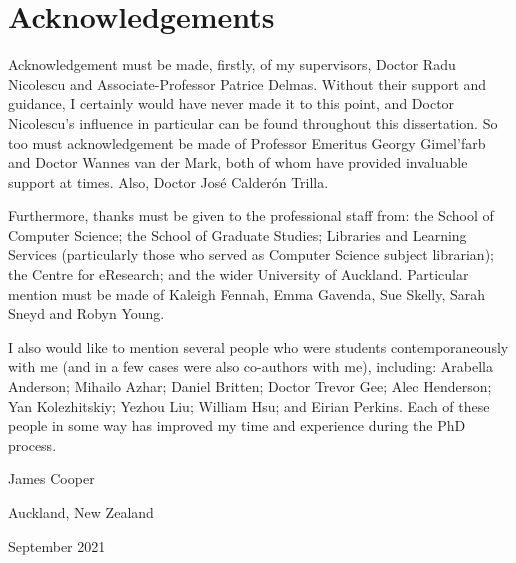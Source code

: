 \chapter*{Acknowledgements}

Acknowledgement must be made, firstly, of my supervisors, Doctor Radu Nicolescu and Associate-Professor Patrice Delmas.  Without their support and guidance, I certainly would have never made it to this point, and Doctor Nicolescu's influence in particular can be found throughout this dissertation.  So too must acknowledgement be made of Professor Emeritus Georgy Gimel'farb and Doctor Wannes van der Mark, both of whom have provided invaluable support at times.  Also, Doctor José Calderón Trilla.

Furthermore, thanks must be given to the professional staff from: the School of Computer Science; the School of Graduate Studies; Libraries and Learning Services (particularly those who served as Computer Science subject librarian); the Centre for eResearch; and the wider University of Auckland.  Particular mention must be made of Kaleigh Fennah, Emma Gavenda, Sue Skelly, Sarah Sneyd and Robyn Young.

I also would like to mention several people who were students contemporaneously with me (and in a few cases were also co-authors with me), including: Arabella Anderson; Mihailo Azhar; Daniel Britten; Doctor Trevor Gee; Alec Henderson; Yan Kolezhitskiy; Yezhou Liu; William Hsu; and Eirian Perkins.  Each of these people in some way has improved my time and experience during the PhD process.

\vspace{1cm}
\hfill James Cooper

\hfill Auckland, New Zealand

\hfill September 2021

